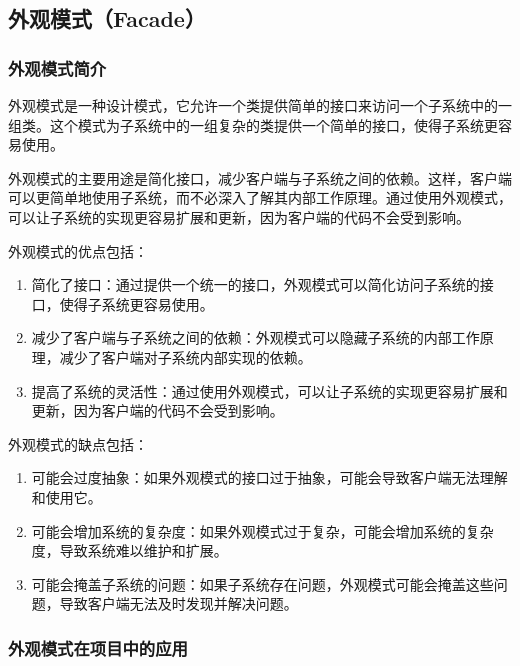 \subsection{外观模式（Facade）}

\subsubsection{外观模式简介}

外观模式是一种设计模式，它允许一个类提供简单的接口来访问一个子系统中的一组类。这个模式为子系统中的一组复杂的类提供一个简单的接口，使得子系统更容易使用。

外观模式的主要用途是简化接口，减少客户端与子系统之间的依赖。这样，客户端可以更简单地使用子系统，而不必深入了解其内部工作原理。通过使用外观模式，可以让子系统的实现更容易扩展和更新，因为客户端的代码不会受到影响。

外观模式的优点包括：

\begin{enumerate}
    \item 简化了接口：通过提供一个统一的接口，外观模式可以简化访问子系统的接口，使得子系统更容易使用。
    \item 减少了客户端与子系统之间的依赖：外观模式可以隐藏子系统的内部工作原理，减少了客户端对子系统内部实现的依赖。
    \item 提高了系统的灵活性：通过使用外观模式，可以让子系统的实现更容易扩展和更新，因为客户端的代码不会受到影响。
\end{enumerate}

外观模式的缺点包括：

\begin{enumerate}
    \item 可能会过度抽象：如果外观模式的接口过于抽象，可能会导致客户端无法理解和使用它。
    \item 可能会增加系统的复杂度：如果外观模式过于复杂，可能会增加系统的复杂度，导致系统难以维护和扩展。
    \item 可能会掩盖子系统的问题：如果子系统存在问题，外观模式可能会掩盖这些问题，导致客户端无法及时发现并解决问题。
\end{enumerate}

\subsubsection{外观模式在项目中的应用}

